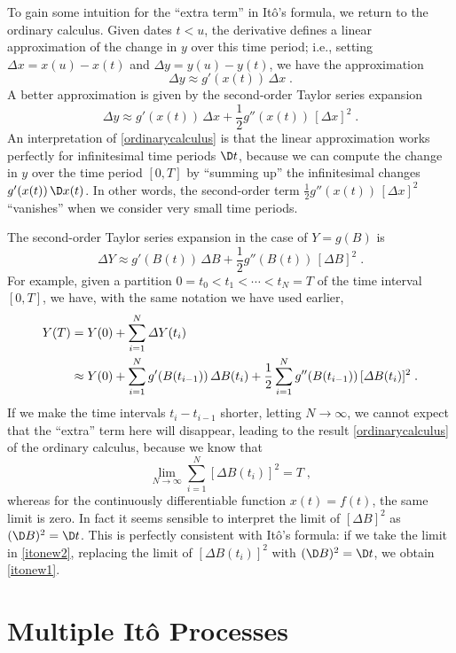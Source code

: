 To gain some intuition for the ``extra term'' in It\^o's formula, we return to the ordinary calculus.  Given dates $t<u$, the derivative defines a linear approximation of the change in $y$ over this time period; i.e., setting $\varDelta x = x(u)-x(t)$ and $\varDelta y = y(u) - y(t)$, we have the approximation
$$\varDelta y \approx g'(x(t)) \,\varDelta x\; .$$
A better approximation is given by the second-order Taylor series expansion
$$\varDelta y \approx g'(x(t))\,\varDelta x + \frac{1}{2} g''(x(t))\,[\varDelta x]^2\; .$$
An interpretation of  \eqref{ordinarycalculus} is that the linear approximation works perfectly for infinitesimal time periods $\D t$, because we can compute the change in $y$ over the time period $[0,T]$ by ``summing up'' the infinitesimal changes $g'(x(t))\,\D x(t)$.  In other words, the second-order term $\frac{1}{2} g''(x(t))\,[\varDelta x]^2$ ``vanishes'' when we consider very small time periods.

The second-order Taylor series expansion in the case of $Y=g(B)$ is 
$$\varDelta Y \approx g'(B(t))\,\varDelta B + \frac{1}{2} g''(B(t))\,[\varDelta B]^2\; .$$
For example, given a partition $0=t_0 < t_1 < \cdots < t_N=T$ of the time interval $[0,T]$, we have, with the same notation we have used earlier,
\begin{align}
Y(T) &= Y(0) + \sum_{i=1}^N \varDelta Y(t_i) \notag \\
&\approx Y(0) + \sum_{i=1}^N g'(B(t_{i-1}))\,\varDelta B(t_i) + \frac{1}{2} \sum_{i=1}^N g''(B(t_{i-1}))\,[\varDelta B(t_i)]^2\;.\label{itonew2}
\end{align}
If we make the time intervals $t_i-t_{i-1}$ shorter, letting $N \rightarrow \infty$, we cannot expect that the ``extra'' term here will disappear, leading to the result \eqref{ordinarycalculus} of the ordinary calculus, because we know that
$$\lim_{N \rightarrow \infty} \sum_{i=1}^N [\varDelta B(t_i)]^2 = T\; ,$$
whereas for the continuously differentiable function $x(t) = f(t)$, the same limit is zero.  In fact it seems sensible to interpret the limit of $[\varDelta B]^2$ as $(\D B)^2 =\D t$.
This is perfectly consistent with It\^o's formula: if we take the limit in \eqref{itonew2}, replacing the limit of $[\varDelta B(t_i)]^2$ with $(\D B)^2 = \D t$, we obtain \eqref{itonew1}.

\section{Multiple It\^o Processes}

